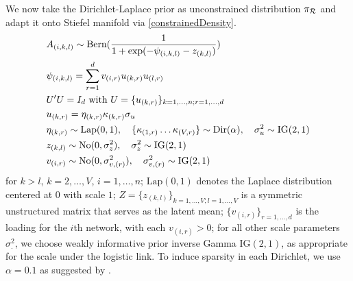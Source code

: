 \documentclass[10pt,fleqn]{article} \pdfoutput=1
\DeclareMathOperator{\1}{\mathbbm{1}} \DeclareMathOperator{\bigO}{\mc O}
\begin{document}
We now take the Dirichlet-Laplace prior \citep{bhattacharya2015dirichlet}
as unconstrained distribution $\pi_{\mathcal{R}}$ and adapt it onto Stiefel
manifold via \eqref{constrainedDensity}.  \begin{equation*} \begin{aligned}
		 & A_{(i,k,l)} \sim \text{Bern}( \frac{1}{1+ \exp(-\psi_{(i,k,l)}-
			z_{(k,l)})})                                                       \\ & \psi_{(i,k,l)} = \sum_{r=1}^{d}  v_{(i,r)} u_{(k,r)}
		u_{(l,r)}                                                          \\ & U'U=I_{d} \text{ with } U=\{u_{(k,r)}\}_{k=1,\ldots,n;
		r=1,\ldots,d}                                                      \\ & u_{(k,r)}= \eta_{(k,r)}\kappa_{(k,r)}\sigma_{u} \\ &
		\eta_{(k,r)}\sim \text{Lap}(0,1), \quad \{\kappa_{(1,r)}\ldots
		\kappa_{(V,r)}\} \sim \text{Dir}(\alpha), \quad \sigma^2_{u}\sim
		\text{IG}(2,1)                                                     \\   & z_{(k,l)} \sim \operatorname{No}(0,\sigma^2_z), \quad  \sigma^2_z
		\sim \text{IG}(2,1)                                                \\ & v_{(i,r)} \sim \operatorname{No}(0,\sigma^2_{v,(r)}), \quad
		\sigma^2_{v,(r)} \sim \text{IG}(2,1)\end{aligned} \end{equation*} for
$k>l$, $k=2,\ldots, V$, $i=1,\ldots,n$;  $\text{Lap}(0,1)$ denotes the
Laplace distribution centered at $0$ with scale $1$;
$Z=\{z_{(k,l)}\}_{k=1,\ldots,V;l=1,\ldots,V}$ is a symmetric unstructured
matrix that serves as the latent mean; $\{ v_{(i,r)}\}_{r=1,\ldots,d}$ is
the loading for the $i$th network, with each $v_{(i,r)}>0$; for all other
scale parameters $\sigma^2_.$, we choose weakly informative prior inverse
Gamma $\text{IG}(2,1)$, as appropriate for the scale under the logistic
link. To induce sparsity in each Dirichlet, we use $\alpha=0.1$ as
suggested by \cite{bhattacharya2015dirichlet}.
\end{document}
